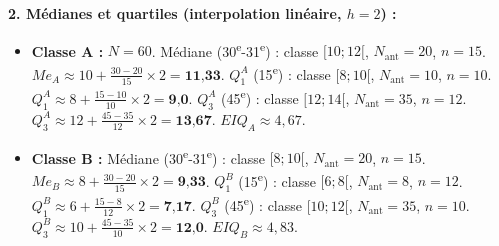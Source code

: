 \documentclass[11pt]{article}
\begin{document}
\begin{exemplebox}
\textbf{2. Médianes et quartiles (interpolation linéaire, $h=2$) :}
\begin{itemize}
    \item \textbf{Classe A :} $N=60$. Médiane (30\textsuperscript{e}-31\textsuperscript{e}) : classe $[10;12[$, $N_{\text{ant}}=20$, $n=15$.
    $Me_A \approx 10 + \frac{30-20}{15} \times 2 = \textbf{11,33}$.
    $Q_1^A$ (15\textsuperscript{e}) : classe $[8;10[$, $N_{\text{ant}}=10$, $n=10$.
    $Q_1^A \approx 8 + \frac{15-10}{10} \times 2 = \textbf{9,0}$.
    $Q_3^A$ (45\textsuperscript{e}) : classe $[12;14[$, $N_{\text{ant}}=35$, $n=12$.
    $Q_3^A \approx 12 + \frac{45-35}{12} \times 2 = \textbf{13,67}$.
    $EIQ_A \approx 4,67$.
    \item \textbf{Classe B :} Médiane (30\textsuperscript{e}-31\textsuperscript{e}) : classe $[8;10[$, $N_{\text{ant}}=20$, $n=15$.
    $Me_B \approx 8 + \frac{30-20}{15} \times 2 = \textbf{9,33}$.
    $Q_1^B$ (15\textsuperscript{e}) : classe $[6;8[$, $N_{\text{ant}}=8$, $n=12$.
    $Q_1^B \approx 6 + \frac{15-8}{12} \times 2 = \textbf{7,17}$.
    $Q_3^B$ (45\textsuperscript{e}) : classe $[10;12[$, $N_{\text{ant}}=35$, $n=10$.
    $Q_3^B \approx 10 + \frac{45-35}{10} \times 2 = \textbf{12,0}$.
    $EIQ_B \approx 4,83$.
\end{itemize}


\end{exemplebox}
\end{document}
